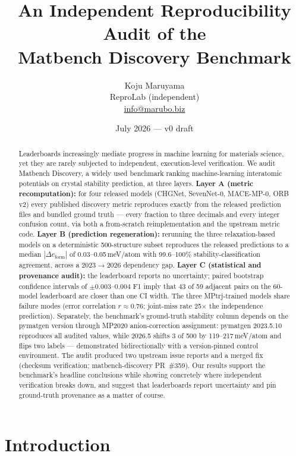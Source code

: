 \documentclass[11pt]{article}
\title{An Independent Reproducibility Audit of the\\Matbench Discovery Benchmark}
\author{Koju Maruyama\\
\normalsize ReproLab (independent)\\
\normalsize \href{mailto:info@marubo.biz}{info@marubo.biz}}
\date{July 2026 --- v0 draft}
\newcommand{\meV}{\,meV/atom}
\begin{document}
\maketitle

\begin{abstract}
Leaderboards increasingly mediate progress in machine learning for materials
science, yet they are rarely subjected to independent, execution-level
verification. We audit Matbench Discovery, a widely used benchmark ranking
machine-learning interatomic potentials on crystal stability prediction, at
three layers. \textbf{Layer A (metric recomputation):} for four released models
(CHGNet, SevenNet-0, MACE-MP-0, ORB v2) every published discovery metric
reproduces exactly from the released prediction files and bundled ground truth
--- every fraction to three decimals and every integer confusion count, via both
a from-scratch reimplementation and the upstream metric code.
\textbf{Layer B (prediction regeneration):} rerunning the three
relaxation-based models on a deterministic 500-structure subset reproduces the
released predictions to a median $|\Delta e_\mathrm{form}|$ of
0.03--0.05\meV{} with 99.6--100\% stability-classification agreement, across a
2023$\to$2026 dependency gap. \textbf{Layer C (statistical and provenance
audit):} the leaderboard reports no uncertainty; paired bootstrap confidence
intervals of $\pm$0.003--0.004 F1 imply that 43 of 59 adjacent pairs on the
60-model leaderboard are closer than one CI width. The three MPtrj-trained
models share failure modes (error correlation $r\approx0.76$; joint-miss rate
25$\times$ the independence prediction). Separately, the benchmark's
ground-truth stability column depends on the pymatgen version through MP2020
anion-correction assignment: pymatgen 2023.5.10 reproduces all audited values,
while 2026.5 shifts 3 of 500 by 119--217\meV{} and flips two labels ---
demonstrated bidirectionally with a version-pinned control environment. The
audit produced two upstream issue reports and a merged fix (checksum
verification; matbench-discovery PR~\#359). Our results support the
benchmark's headline conclusions while showing concretely where independent
verification breaks down, and suggest that leaderboards report uncertainty and
pin ground-truth provenance as a matter of course.
\end{abstract}

\section{Introduction}
\end{document}
